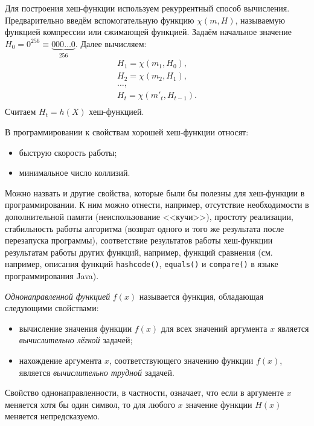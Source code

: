 Для построения хеш-функции используем рекуррентный способ вычисления. Предварительно введём вспомогательную функцию $\chi(m, H)$, называемую функцией компрессии или сжимающей функцией. Задаём начальное значение $H_{0} = 0^{256} \equiv \underbrace{000 \ldots 0}_{256} $. Далее вычисляем:
\[ \begin{array}{l}
    H_1 = \chi( m_1, H_0), \\
    H_2 = \chi( m_2, H_1), \\
    \dots,\\
    H_t = \chi( m'_t, H_{t-1}). \\
\end{array} \]
Считаем $H_{t} = h(X)$ хеш-функцией.
\exampleend

В программировании к свойствам хорошей хеш-функции относят:
\begin{itemize}
    \item быструю скорость работы;
    \item минимальное число коллизий.
\end{itemize}

\begin{sloppypar}Можно назвать и другие свойства, которые были бы полезны для хеш-функции в программировании. К ним можно отнести, например, отсутствие необходимости в дополнительной памяти (неиспользование <<кучи>>), простоту реализации, стабильность работы алгоритма (возврат одного и того же результата после перезапуска программы), соответствие результатов работы хеш-функции результатам работы других функций, например, функций сравнения (см. например, описания функций \texttt{hashcode()}, \texttt{equals()} и \texttt{compare()} в языке программирования Java).\end{sloppypar}

\emph{Однонаправленной функцией} $f(x)$ называется функция, обладающая следующими свойствами:
\begin{itemize}
    \item вычисление значения функции $f(x)$ для всех значений аргумента $x$ является \emph{вычислительно лёгкой} задачей;
    \item нахождение аргумента $x$, соответствующего значению функции $f(x)$, является \emph{вычислительно трудной} задачей.
\end{itemize}

Свойство однонаправленности, в частности, означает, что если в аргументе $x$ меняется хотя бы один символ, то для любого $x$ значение функции $H(x)$ меняется непредсказуемо.

